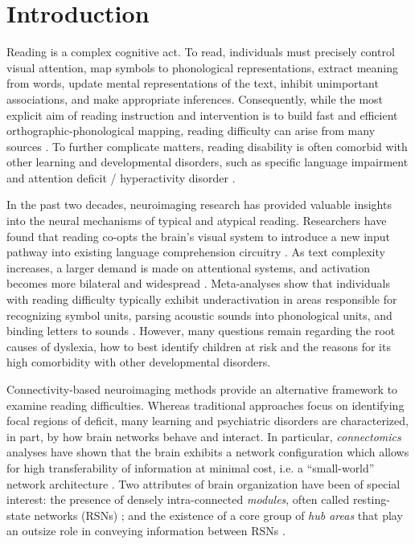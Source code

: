 \section{Introduction}
Reading is a complex cognitive act. To read, individuals must precisely control visual attention, map symbols to phonological representations, extract meaning from words, update mental representations of the text, inhibit unimportant associations, and make appropriate inferences. Consequently, while the most explicit aim of reading instruction and intervention is to build fast and efficient orthographic-phonological mapping, reading difficulty can arise from many sources \cite{Pennington2009, vanderLely2010}. To further complicate matters, reading disability is often comorbid with other learning and developmental disorders, such as specific language impairment and attention deficit / hyperactivity disorder \cite{Pennington2006, Margari2013}.

In the past two decades, neuroimaging research has provided valuable insights into the neural mechanisms of typical and atypical reading. Researchers have found that reading co-opts the brain's visual system to introduce a new input pathway into existing language comprehension circuitry \cite{Jobard2007}. As text complexity increases, a larger demand is made on attentional systems, and activation becomes more bilateral and widespread \cite{Xu2005}.  Meta-analyses show that individuals with reading difficulty typically exhibit underactivation in areas responsible for recognizing symbol units, parsing acoustic sounds into phonological units, and binding letters to sounds \cite{Maisog2008, Richlan2009, Paulesu2014}. However, many questions remain regarding the root causes of dyslexia, how to best identify children at risk and the reasons for its high comorbidity with other developmental disorders. 

Connectivity-based neuroimaging methods provide an alternative framework to examine reading difficulties. Whereas traditional  approaches focus on identifying focal regions of deficit, many learning and psychiatric disorders are characterized, in part, by how brain networks behave and interact. In particular, \textit{connectomics} analyses have shown that the brain exhibits a network configuration which allows for high transferability of information at minimal cost, i.e. a “small-world” network architecture \cite{Bullmore2012}. Two attributes of brain organization have been of special interest: the presence of densely intra-connected \textit{modules}, often called resting-state networks (RSNs) \cite{Sporns2016}; and the existence of a core group of \textit{hub areas} that play an outsize role in conveying information between RSNs \cite{VandenHeuvel2011}. 

